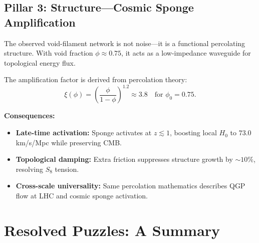 \documentclass[12pt,a4paper]{article}
\begin{document}
\subsection{Pillar 3: Structure---Cosmic Sponge Amplification}

The observed void-filament network is not noise---it is a functional percolating structure. With void fraction $\phi \approx 0.75$, it acts as a low-impedance waveguide for topological energy flux.

The amplification factor is derived from percolation theory:
\begin{equation}
\xi(\phi) = \left(\frac{\phi}{1-\phi}\right)^{1.2} \approx 3.8 \quad \text{for } \phi_0 = 0.75.
\end{equation}

\textbf{Consequences:}
\begin{itemize}
    \item \textbf{Late-time activation:} Sponge activates at $z \lesssim 1$, boosting local $H_0$ to $73.0$ km/s/Mpc while preserving CMB.
    \item \textbf{Topological damping:} Extra friction suppresses structure growth by $\sim 10\%$, resolving $S_8$ tension.
    \item \textbf{Cross-scale universality:} Same percolation mathematics describes QGP flow at LHC and cosmic sponge activation.
\end{itemize}

\section{Resolved Puzzles: A Summary}
\end{document}
